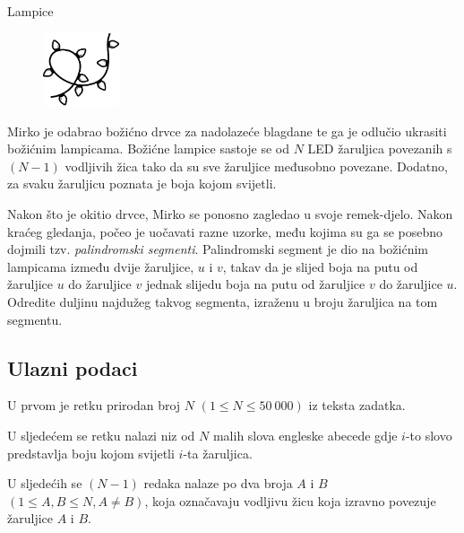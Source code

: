 \begin{statement}[
  problempoints=110,
  timelimit=1 sekunda,
  memorylimit=512 MiB,
]{Lampice}

\setlength\intextsep{-0.1cm}
\begin{figure}
\centering
\includegraphics[width=0.2\textwidth]{img/lampice.png}
\end{figure}

Mirko je odabrao božićno drvce za nadolazeće blagdane te ga je odlučio ukrasiti
božićnim lampicama. Božićne lampice sastoje se od $N$ LED žaruljica povezanih s
$(N - 1)$ vodljivih žica tako da su sve žaruljice međusobno povezane. Dodatno,
za svaku žaruljicu poznata je boja kojom svijetli.

Nakon što je okitio drvce, Mirko se ponosno zagledao u svoje remek-djelo. Nakon
kraćeg gledanja, počeo je uočavati razne uzorke, među kojima su ga se posebno
dojmili tzv. \textit{palindromski segmenti}. Palindromski segment je dio na
božićnim lampicama između dvije žaruljice, $u$ i $v$, takav da je slijed boja na
putu od žaruljice $u$ do žaruljice $v$ jednak slijedu boja na putu od žaruljice
$v$ do žaruljice $u$.
Odredite duljinu najdužeg takvog segmenta, izraženu u broju žaruljica na tom
segmentu.


\subsection*{Ulazni podaci}
U prvom je retku prirodan broj $N$ $(1 \le N \le 50\ 000)$ iz teksta zadatka.

U sljedećem se retku nalazi niz od $N$ malih slova engleske abecede gdje $i$-to
slovo predstavlja boju kojom svijetli $i$-ta žaruljica.

U sljedećih se $(N - 1)$ redaka nalaze po dva broja $A$ i $B$
$(1 \le A, B \le N, A \neq B)$,
koja označavaju vodljivu žicu koja izravno povezuje žaruljice $A$ i $B$.


\end{statement}
